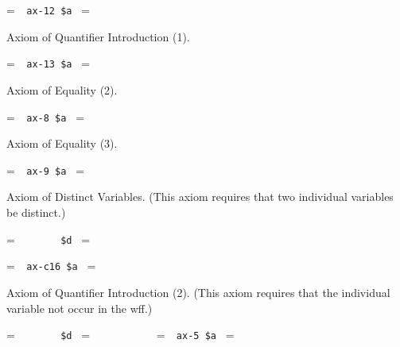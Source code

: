 \setbox\startprefix=\hbox{\tt \ \ ax-12\ \$a\ }
\setbox\contprefix=\hbox{\tt \ \ \ \ \ \ \ \ \ \ \ }
\startm
\m{\vdash}\m{(}\m{\lnot}\m{\forall}\m{=}\m{\rightarrow}\m{(}
\m{=}\m{\rightarrow}\m{(}\m{\varphi}\m{\rightarrow}\m{\forall}\m{(}
\m{=}\m{\rightarrow}\m{\varphi}\m{)}\m{)}\m{)}\m{)}
\endm

\noindent Axiom of Quantifier Introduction (1).

\setbox\startprefix=\hbox{\tt \ \ ax-13\ \$a\ }
\setbox\contprefix=\hbox{\tt \ \ \ \ \ \ \ \ \ \ \ }
\startm
\m{\vdash}\m{(}\m{\lnot}\m{\forall}\m{=}\m{\rightarrow}\m{(}
\m{\lnot}\m{\forall}\m{=}\m{\rightarrow}\m{(}\m{=}
\m{\rightarrow}\m{\forall}\m{=}\m{)}\m{)}\m{)}
\endm

\noindent Axiom of Equality (2).

\setbox\startprefix=\hbox{\tt \ \ ax-8\ \$a\ }
\setbox\contprefix=\hbox{\tt \ \ \ \ \ \ \ \ \ \ \ }
\startm
\m{\vdash}\m{(}\m{=}\m{\rightarrow}\m{(}\m{\in}\m{
\rightarrow}\m{\in}\m{)}\m{)}
\endm

\noindent Axiom of Equality (3).

\setbox\startprefix=\hbox{\tt \ \ ax-9\ \$a\ }
\setbox\contprefix=\hbox{\tt \ \ \ \ \ \ \ \ \ \ \ }
\startm
\m{\vdash}\m{(}\m{=}\m{\rightarrow}\m{(}\m{\in}\m{
\rightarrow}\m{\in}\m{)}\m{)}
\endm

\noindent Axiom of Distinct Variables.  (This axiom requires
that two individual variables
be distinct.)

\setbox\startprefix=\hbox{\tt \ \ \ \ \ \ \ \ \$d\ }
\setbox\contprefix=\hbox{\tt \ \ \ \ \ \ \ \ \ \ \ }
\startm
{}\m{\,}
\endm

\setbox\startprefix=\hbox{\tt \ \ ax-c16\ \$a\ }
\setbox\contprefix=\hbox{\tt \ \ \ \ \ \ \ \ \ \ \ }
\startm
\m{\vdash}\m{(}\m{\forall}\m{=}\m{\rightarrow}\m{(}\m{\varphi}\m{
\rightarrow}\m{\forall}\m{\varphi}\m{)}\m{)}
\endm

\noindent Axiom of Quantifier Introduction (2).  (This axiom requires
that the individual variable not occur in the
wff.)

\setbox\startprefix=\hbox{\tt \ \ \ \ \ \ \ \ \$d\ }
\setbox\contprefix=\hbox{\tt \ \ \ \ \ \ \ \ \ \ \ }
\startm
{}\m{\,}\m{\varphi}
\endm
\setbox\startprefix=\hbox{\tt \ \ ax-5\ \$a\ }
\setbox\contprefix=\hbox{\tt \ \ \ \ \ \ \ \ \ \ \ }
\startm
\m{\vdash}\m{(}\m{\varphi}\m{\rightarrow}\m{\forall}\m{\varphi}\m{)}
\endm

